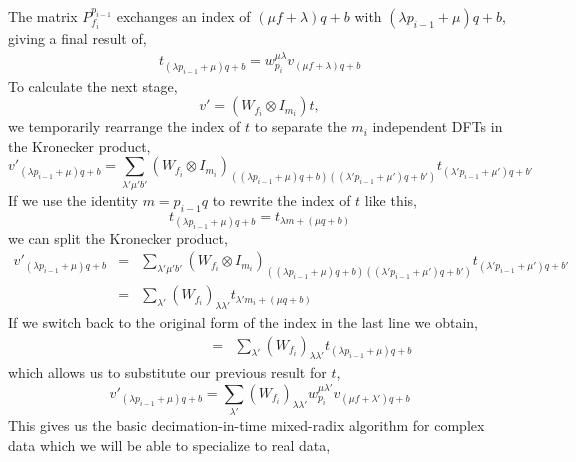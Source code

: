 \documentclass[fleqn,12pt]{article}
\newenvironment{algorithm}{\begin{quote} %
\begin{algorithmic}\samepage}{\end{algorithmic} %
\end{quote}}
\begin{document}
%
The matrix $P^{p_{i-1}}_{f_i}$ exchanges an index of $(\mu f +
\lambda) q + b$ with $(\lambda p_{i-1} + \mu) q + b$, giving a final
result of,
%
\begin{eqnarray}
t_{(\lambda p_{i-1} + \mu) q + b} 
= 
w^{\mu\lambda}_{p_i} v_{(\mu f + \lambda)q +b}
\end{eqnarray}
%
To calculate the next stage,
%
\begin{equation}
v' = (W_{f_i} \otimes I_{m_i}) t,
\end{equation}
%
we temporarily rearrange the index of $t$ to separate the $m_{i}$
independent DFTs in the Kronecker product,
%
\begin{equation}
v'_{(\lambda p_{i-1} + \mu) q + b} 
=
\sum_{\lambda' \mu' b'}
(W_{f_i} \otimes I_{m_i})_{
((\lambda p_{i-1} + \mu) q + b)
((\lambda' p_{i-1} + \mu') q + b')}
t_{(\lambda' p_{i-1} + \mu') q + b'}
\end{equation}
%
If we use the identity $m = p_{i-1} q$ to rewrite the index of $t$
like this,
%
\begin{equation}
t_{(\lambda p_{i-1} + \mu) q + b} = t_{\lambda m + (\mu q + b)}
\end{equation}
%
we can split the Kronecker product,
%
\begin{eqnarray}
v'_{(\lambda p_{i-1} + \mu) q + b}
&=&
\sum_{\lambda' \mu' b'}
(W_{f_i} \otimes I_{m_i})_{
((\lambda p_{i-1} + \mu) q + b)
((\lambda' p_{i-1} + \mu') q + b')}
t_{(\lambda' p_{i-1} + \mu') q + b'}\\
&=&
\sum_{\lambda'}
(W_{f_i})_{\lambda \lambda'}
t_{\lambda' m_i + (\mu q + b)} 
\end{eqnarray}
%
If we switch back to the original form of the index in the last line we obtain,
%
\begin{eqnarray}
\phantom{v'_{(\lambda p_{i-1} + \mu) q + b}}
&=&
\sum_{\lambda'}
(W_{f_i})_{\lambda \lambda'}
t_{(\lambda p_{i-1} + \mu) q + b}
\end{eqnarray}
%
which allows us to substitute our previous result for $t$,
%
\begin{equation}
v'_{(\lambda p_{i-1} + \mu) q + b} 
= 
\sum_{\lambda'}
(W_{f_i})_{\lambda \lambda'}
w^{\mu\lambda'}_{p_i} v_{(\mu f + \lambda')q + b}
\end{equation}
%
This gives us the basic decimation-in-time mixed-radix algorithm for
complex data which we will be able to specialize to real data,
%
\begin{algorithm}
\ENDFOR
{}
\ENDFOR
\ENDFOR
\ENDFOR
{}
\ENDFOR
\end{algorithm}
\end{document}
